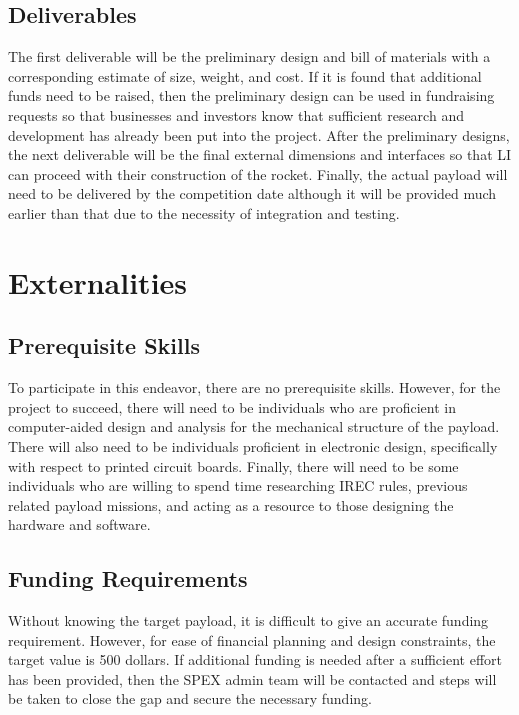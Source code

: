 \documentclass[conference]{IEEEtran} %
\begin{document}
\subsection{Deliverables}
\label{subsec:deliverables}
The first deliverable will be the preliminary design and bill of materials with a corresponding estimate of size, weight, and
cost. If it is found that additional funds need to be raised, then the preliminary design can be used in fundraising requests
so that businesses and investors know that sufficient research and development has already been put into the project. After the
preliminary designs, the next deliverable will be the final external dimensions and interfaces so that LI can proceed with their
construction of the rocket. Finally, the actual payload will need to be delivered by the competition date although it will be provided
much earlier than that due to the necessity of integration and testing.

\section{Externalities}
\subsection{Prerequisite Skills}
To participate in this endeavor, there are no prerequisite skills. However, for the project to succeed, there will need to be
individuals who are proficient in computer-aided design and analysis for the mechanical structure of the payload. There will
also need to be individuals proficient in electronic design, specifically with respect to printed circuit boards. Finally,
there will need to be some individuals who are willing to spend time researching IREC rules, previous related
payload missions, and acting as a resource to those designing the hardware and software.

\subsection{Funding Requirements}
Without knowing the target payload, it is difficult to give an accurate funding requirement. However, for ease of financial
planning and design constraints, the target value is 500 dollars. If additional funding is needed after a sufficient effort
has been provided, then the SPEX admin team will be contacted and steps will be taken to close the gap and secure the necessary
funding.
\end{document}
